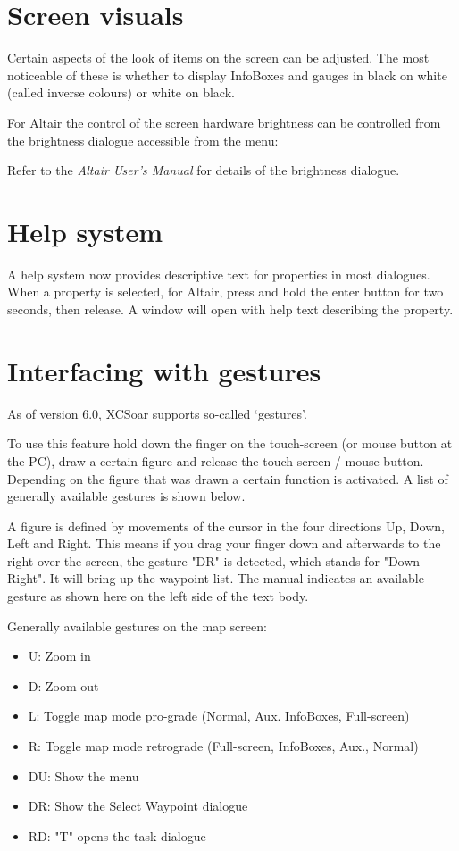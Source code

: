 \section{Screen visuals}

Certain aspects of the look of items on the screen can be adjusted.
The most noticeable of these is whether to display InfoBoxes and
gauges in black on white (called inverse colours) or white on black.

For Altair the control of the screen hardware 
brightness can be controlled from the brightness dialogue
accessible from the menu:
\begin{quote}
\blink{}
\end{quote}

Refer to the {\em Altair User's Manual} for details of the brightness
dialogue.


\section{Help system}
A help system now provides descriptive text for properties in
most dialogues.  When a property is selected, for Altair, press and hold the
enter button for two seconds, then release.  A window will open with
help text describing the property.

\section{Interfacing with gestures}\label{sec:gestures}
As of version 6.0, XCSoar supports so-called `gestures'.

To use this feature hold down the finger on the 
touch-screen (or mouse button at the PC), draw a certain figure and release the touch-screen / mouse button. Depending on the figure that was drawn 
a certain function is activated. A list of generally available gestures is 
shown below. 

A figure is defined by movements of the 
cursor in the four directions Up, Down, Left and Right. This means if 
you drag your finger down and afterwards to the right over the screen,  the gesture "DR" is detected,
which stands for "Down-Right". It will bring up the waypoint list. The manual indicates an available gesture as shown here on the left side of the text body.

Generally available gestures on the map screen:
\begin{itemize}
\item U: Zoom in
\item D: Zoom out
\item L: Toggle map mode pro-grade (Normal, Aux. InfoBoxes, Full-screen)
\item R: Toggle map mode retrograde (Full-screen, InfoBoxes, Aux., Normal)
\item DU: Show the menu
\item DR: Show the Select Waypoint dialogue
\item RD: "T" opens the task dialogue
\end{itemize}

